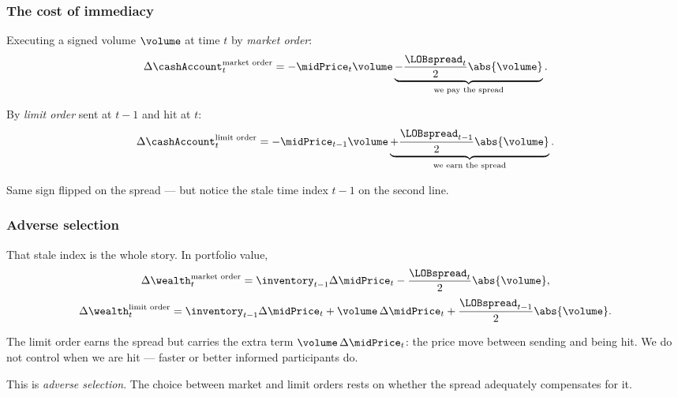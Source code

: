 \begin{frame}
  \frametitle{The cost of immediacy}
Executing a signed volume $\volume$ at time $t$ by \emph{market order}:
\[
\Delta \cashAccount_t^{\text{market order}}
= -\midPrice_{t}\volume
\underbrace{-\frac{\LOBspread_t}{2}\abs{\volume}}_{\text{we pay the spread}}.
\]

\pause

By \emph{limit order} sent at $t-1$ and hit at $t$:
\[
\Delta \cashAccount_t^{\text{limit order}}
= -\midPrice_{t-1}\volume
\underbrace{+\frac{\LOBspread_{t-1}}{2}\abs{\volume}}_{\text{we earn the spread}}.
\]

\pause

Same sign flipped on the spread ---
but notice the stale time index $t-1$ on the second line.
\end{frame}

\begin{frame}
  \frametitle{Adverse selection}
That stale index is the whole story. In portfolio value,
\[
\Delta \wealth_t^{\text{market order}}
= \inventory_{t-1}\Delta \midPrice_t - \frac{\LOBspread_t}{2}\abs{\volume},
\]
\[
\Delta \wealth_t^{\text{limit order}}
= \inventory_{t-1}\Delta \midPrice_t
+ \volume\, \Delta \midPrice_t
+ \frac{\LOBspread_{t-1}}{2}\abs{\volume}.
\]

\pause

The limit order earns the spread but carries the extra term $\volume\,\Delta\midPrice_t$:
the price move between sending and being hit.
We do not control when we are hit --- faster or better informed participants do.

\pause

This is \emph{adverse selection}.
The choice between market and limit orders rests on whether the spread
adequately compensates for it.
\end{frame}
